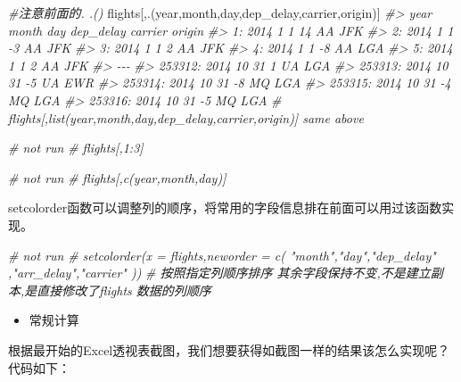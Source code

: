 \documentclass[
]{book}
\newenvironment{Shaded}{\begin{snugshade}}{\end{snugshade}}
\newcommand{\CommentTok}[1]{\textcolor[rgb]{0.56,0.35,0.01}{\textit{#1}}}
\newcommand{\NormalTok}[1]{#1}
\providecommand{\tightlist}{%
  \setlength{\itemsep}{0pt}\setlength{\parskip}{0pt}}
\begin{document}
\begin{Shaded}
\begin{Highlighting}[]
\CommentTok{\#注意前面的. .()}
\NormalTok{flights[,.(year,month,day,dep\_delay,carrier,origin)] }
\CommentTok{\#\textgreater{}         year month day dep\_delay carrier origin}
\CommentTok{\#\textgreater{}      1: 2014     1   1        14      AA    JFK}
\CommentTok{\#\textgreater{}      2: 2014     1   1        {-}3      AA    JFK}
\CommentTok{\#\textgreater{}      3: 2014     1   1         2      AA    JFK}
\CommentTok{\#\textgreater{}      4: 2014     1   1        {-}8      AA    LGA}
\CommentTok{\#\textgreater{}      5: 2014     1   1         2      AA    JFK}
\CommentTok{\#\textgreater{}     {-}{-}{-}                                        }
\CommentTok{\#\textgreater{} 253312: 2014    10  31         1      UA    LGA}
\CommentTok{\#\textgreater{} 253313: 2014    10  31        {-}5      UA    EWR}
\CommentTok{\#\textgreater{} 253314: 2014    10  31        {-}8      MQ    LGA}
\CommentTok{\#\textgreater{} 253315: 2014    10  31        {-}4      MQ    LGA}
\CommentTok{\#\textgreater{} 253316: 2014    10  31        {-}5      MQ    LGA}
\CommentTok{\# flights[,list(year,month,day,dep\_delay,carrier,origin)]  same above}

\CommentTok{\# not run}
\CommentTok{\# flights[,1:3]}

\CommentTok{\# not run}
\CommentTok{\# flights[,c(\textquotesingle{}year\textquotesingle{},\textquotesingle{}month\textquotesingle{},\textquotesingle{}day\textquotesingle{})]}
\end{Highlighting}
\end{Shaded}

setcolorder函数可以调整列的顺序，将常用的字段信息排在前面可以用过该函数实现。

\begin{Shaded}
\begin{Highlighting}[]
\CommentTok{\# not run}
\CommentTok{\# setcolorder(x = flights,neworder = c( "month","day","dep\_delay" ,"arr\_delay","carrier" )) }
\CommentTok{\# 按照指定列顺序排序 其余字段保持不变,不是建立副本,是直接修改了flights 数据的列顺序}
\end{Highlighting}
\end{Shaded}

\begin{itemize}
\tightlist
\item
  常规计算
\end{itemize}

根据最开始的Excel透视表截图，我们想要获得如截图一样的结果该怎么实现呢？代码如下：
\end{document}
